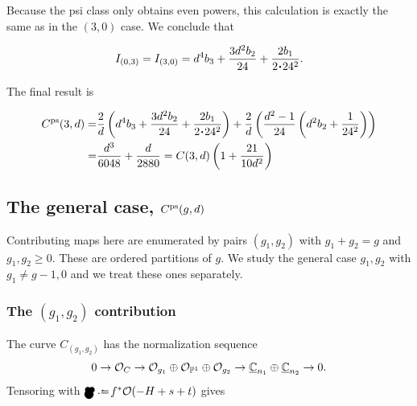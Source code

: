 \documentclass[12pt]{memoir}
\newcommand{\Mickey}{\pre{\raisebox{-1mm}{\scalebox{1.3}{\ensuremath\bullet}}}\hspace{-2.3 mm}{\raisebox{-1.65mm}{\scalebox{2.1}{\ensuremath\bullet}}}^{\hspace{-2.1mm}\raisebox{-1mm}{\scalebox{1.3}{\ensuremath\bullet}}}}
\begin{document}

Because the psi class only obtains even powers, this calculation is exactly the same as in the \((3,0)\) case. We conclude that


\[I_{(0,3)}=I_{(3,0)}=d^4b_3+\frac{3d^2b_2}{24}+\frac{2b_1}{2\.24^2}.\]


The final result is

\begin{align*}
    C^{\ps}(3,d)= & \frac2d\left(d^4b_3+\frac{3d^2b_2}{24}+\frac{2b_1}{2\.24^2}\right)+\frac2d\left(\frac{d^2-1}{24}\left(d^2b_2+\frac{1}{24^2}\right)\right) \\
    =             & \frac{d^3}{6048}+\frac{d}{2880}=C(3,d)\left(1+\frac{21}{10d^2}\right)
\end{align*}

\subsection{The general case, \(C^{\operatorname{\mathrm{ps}}}(g,d)\)}

Contributing maps here are enumerated by pairs \((g_1,g_2)\) with \(g_1+g_2=g\) and \(g_1,g_2\geq0\). These are ordered partitions of \(g\). We study the general case \(g_1,g_2\) with \(g_1\neq g-1,0\) and we treat these ones separately.

\subsubsection{The \((g_1,g_2)\) contribution}

The curve \(C_{(g_1,g_2)}\) has the normalization sequence
\[0\to\mathcal{O}_C\to\mathcal{O}_{g_1}\oplus\mathcal{O}_{\mathbb{P}^1}\oplus\mathcal{O}_{g_2}\to\underline{\mathbb{C}}_{n_1}\oplus\underline{\mathbb{C}}_{n_2}\to0.\]
Tensoring with \(\Mickey\defeq f^\ast\cO(-H+s+t)\) gives
\end{document}
